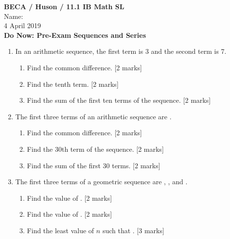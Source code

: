 \documentclass[12pt]{article}
\begin{document}
\begin{center}
\textbf{BECA / Huson / 11.1 IB Math SL}\\
Name:\underline{\hspace{5cm}}\\[6pt]
4 April 2019\\[12pt]
\textbf{Do Now: Pre-Exam Sequences and Series}
\end{center}

\begin{enumerate}
\item In an arithmetic sequence, the first term is 3 and the second term is 7.
    \begin{enumerate}
        \item Find the common difference. \hfill [2 marks]
        \item Find the tenth term. \hfill [2 marks]
        \item Find the sum of the first ten terms of the sequence. \hfill [2 marks]
    \end{enumerate}

\item The first three terms of an arithmetic sequence are \underline{\hspace{2cm}}.
    \begin{enumerate}
        \item Find the common difference. \hfill [2 marks]
        \item Find the 30th term of the sequence. \hfill [2 marks]
        \item Find the sum of the first 30 terms. \hfill [2 marks]
    \end{enumerate}

\item The first three terms of a geometric sequence are \underline{\hspace{1cm}}, \underline{\hspace{1cm}}, and \underline{\hspace{1cm}}.
    \begin{enumerate}
        \item Find the value of \underline{\hspace{1cm}}. \hfill [2 marks]
        \item Find the value of \underline{\hspace{1cm}}. \hfill [2 marks]
        \item Find the least value of $n$ such that \underline{\hspace{1cm}}. \hfill [3 marks]
    \end{enumerate}


\end{enumerate}
\end{document}
